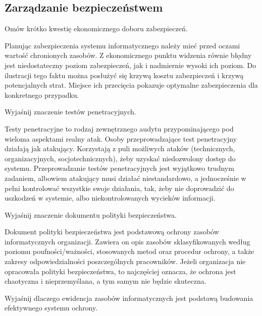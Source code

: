 \documentclass[answers,11pt]{exam}
\begin{document}
\subsection{Zarządzanie bezpieczeństwem}

\begin{questions}

\question Omów krótko kwestię ekonomicznego doboru zabezpieczeń.
\begin{solution}
Planując zabezpieczenia systemu informatycznego należy mieć przed oczami wartość chronionych zasobów. Z ekonomicznego punktu widzenia równie błędny jest niedostateczny poziom zabezpieczeń, jak i nadmiernie wysoki ich poziom. Do ilustracji tego faktu można posłużyć się krzywą kosztu zabezpieczeń i krzywą potencjalnych strat. Miejsce ich przecięcia pokazuje optymalne zabezpieczenia dla konkretnego przypadku. 
\end{solution}

\question Wyjaśnij znaczenie testów penetracyjnych.
\begin{solution}
Testy penetracyjne to rodzaj zewnętrznego audytu przypominającego pod wieloma aspektami realny atak. Osoby przeprowadzające test penetracyjny działają jak atakujący. Korzystają z puli możliwych ataków (technicznych, organizacyjnych, socjotechnicznych), żeby uzyskać niedozwolony dostęp do systemu. Przeprowadzanie testów penetracyjnych jest wyjątkowo trudnym zadaniem, albowiem atakujący musi działać niestandardowo, a jednocześnie w pełni kontrolować wszystkie swoje działania, tak, żeby nie doprowadzić do uszkodzeń w systemie, albo niekontrolowanych wycieków informacji.
\end{solution}

\question Wyjaśnij znaczenie dokumentu polityki bezpieczeństwa.
\begin{solution}
Dokument polityki bezpieczeństwa jest podstawową ochrony zasobów informatycznych organizacji. Zawiera on opis zasobów sklasyfikowanych według poziomu poufności/ważności, stosowanych metod oraz procedur ochrony, a także zakresy odpowiedzialności poszczególnych pracowników. 
Jeżeli organizacja nie opracowała polityki bezpieczeństwa, to najczęściej oznacza, że ochrona jest chaotyczna i nieprzemyślana, a tym samym nie będzie skuteczna.
\end{solution}


\question Wyjaśnij dlaczego ewidencja zasobów informatycznych jest podstawą budowania efektywnego systemu ochrony.


\end{questions}
\end{document}
